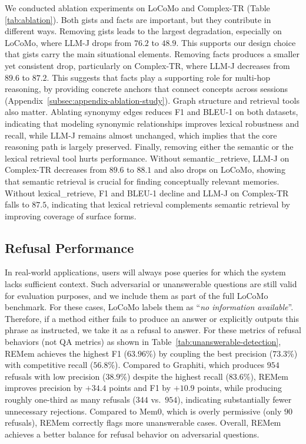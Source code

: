 \documentclass{article} %
\newcommand{\ours}{REMem\xspace}
\begin{document}
We conducted ablation experiments on LoCoMo and Complex-TR (Table \ref{tab:ablation}). 
Both gists and facts are important, but they contribute in different ways.
Removing gists leads to the largest degradation, especially on LoCoMo, where LLM-J drops from $76.2$ to $48.9$.
This supports our design choice that gists carry the main situational elements.
Removing facts produces a smaller yet consistent drop, particularly on Complex-TR, where LLM-J decreases from $89.6$ to $87.2$.
This suggests that facts play a supporting role for multi-hop reasoning, by providing concrete anchors that connect concepts across sessions (Appendix~\ref{subsec:appendix-ablation-study}).
Graph structure and retrieval tools also matter.
Ablating synonymy edges reduces F1 and BLEU-1 on both datasets, indicating that modeling synonymic relationships improves lexical robustness and recall, while LLM-J remains almost unchanged, which implies that the core reasoning path is largely preserved.
Finally, removing either the semantic or the lexical retrieval tool hurts performance.
Without semantic\_retrieve, LLM-J on Complex-TR decreases from $89.6$ to $88.1$ and also drops on LoCoMo, showing that semantic retrieval is crucial for finding conceptually relevant memories.
Without lexical\_retrieve, F1 and BLEU-1 decline and LLM-J on Complex-TR falls to $87.5$, indicating that lexical retrieval complements semantic retrieval by improving coverage of surface forms.



\subsection{Refusal Performance}
\label{subsec:refusal-performance}

In real-world applications, users will always pose queries for which the system lacks sufficient context. 
Such adversarial or unanswerable questions are still valid for evaluation purposes, and we include them as part of the full LoCoMo benchmark.
For these cases, LoCoMo labels them as ``\textit{no information available}''. 
Therefore, if a method either fails to produce an answer or explicitly outputs this phrase as instructed, we take it as a refusal to answer.
For these metrics of refusal behaviors (not QA metrics) as shown in Table~\ref{tab:unanswerable-detection}, \ours achieves the highest F1 ($63.96\%$) by coupling the best precision ($73.3\%$) with competitive recall ($56.8\%$).
Compared to Graphiti, which produces $954$ refusals with low precision ($38.9\%$) despite the highest recall ($83.6\%$), \ours improves precision by $+34.4$ points and F1 by $+10.9$ points, while producing roughly one-third as many refusals ($344$ vs.\ $954$), indicating substantially fewer unnecessary rejections. 
Compared to Mem0, which is overly permissive (only $90$ refusals), \ours correctly flags more unanswerable cases. 
Overall, \ours achieves a better balance for refusal behavior on adversarial questions. 
\end{document}

